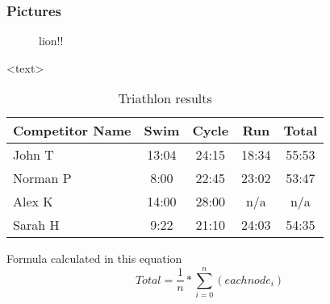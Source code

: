 \documentclass{beamer}
\begin{document}
\begin{frame}
\frametitle{Pictures}
\begin{figure}
\caption{lion!!}
\end{figure}
<text>
\end{frame}

\begin{frame}
\begin{table}
\begin{tabular}{l | c | c | c | c }
Competitor Name & Swim & Cycle & Run & Total \\
\hline \hline
John T & 13:04 & 24:15 & 18:34 & 55:53 \\ 
Norman P & 8:00 & 22:45 & 23:02 & 53:47\\
Alex K & 14:00 & 28:00 & n/a & n/a\\
Sarah H & 9:22 & 21:10 & 24:03 & 54:35 
\end{tabular}
\caption{Triathlon results}
\end{table}
\end{frame}

\begin{frame}
\begin{block}{Formula}
    calculated in this equation
    \begin{equation}    %
            Total = \frac{1}{n}*\sum_{i=0}^n (eachnode_i)
    \end{equation}
\end{block}
\end{frame}
\end{document}
